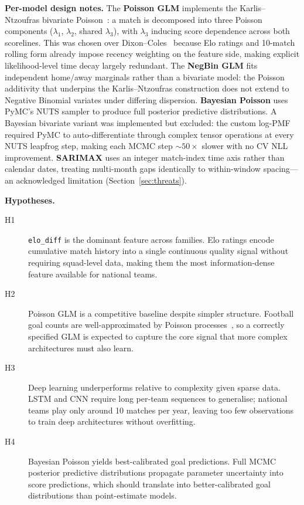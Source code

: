 \documentclass[conference]{IEEEtran}
\begin{document}
\textbf{Per-model design notes.}
The \textbf{Poisson GLM} implements the Karlis--Ntzoufras bivariate
Poisson~\cite{karlis2003analysis}: a match is decomposed into three Poisson
components ($\lambda_1$, $\lambda_2$, shared $\lambda_3$), with $\lambda_3$
inducing score dependence across both scorelines.
This was chosen over Dixon--Coles~\cite{dixon1997modelling} because Elo
ratings and 10-match rolling form already impose recency weighting on the
feature side, making explicit likelihood-level time decay largely redundant.
The \textbf{NegBin GLM} fits independent home/away marginals rather than a
bivariate model: the Poisson additivity that underpins the
Karlis--Ntzoufras construction does not extend to Negative Binomial variates
under differing dispersion.
\textbf{Bayesian Poisson} uses PyMC's NUTS sampler to produce full posterior
predictive distributions.
A Bayesian bivariate variant was implemented but excluded: the custom
log-PMF required PyMC to auto-differentiate through complex tensor
operations at every NUTS leapfrog step, making each MCMC step
${\sim}50\times$ slower with no CV NLL improvement.
\textbf{SARIMAX} uses an integer match-index time axis rather than calendar
dates, treating multi-month gaps identically to within-window spacing---an
acknowledged limitation (Section~\ref{sec:threats}).

\textbf{Hypotheses.}
\begin{description}
  \item[H1] \texttt{elo\_diff} is the dominant feature across families. Elo 
  ratings encode cumulative match history into a single continuous quality signal 
  without requiring squad-level data, making them the most information-dense 
  feature available for national teams.
  \item[H2] Poisson GLM is a competitive baseline despite simpler structure. 
  Football goal counts are well-approximated by Poisson 
  processes~\cite{maher1982modelling},
  so a correctly specified GLM is expected to capture the core signal that more
  complex architectures must also learn.
  \item[H3] Deep learning underperforms relative to complexity given sparse data. 
  LSTM and CNN require long per-team sequences to generalise; national teams play
  only around 10 matches per year, leaving too few observations to train deep
  architectures without overfitting.
  \item[H4] Bayesian Poisson yields best-calibrated goal predictions. Full 
  MCMC posterior predictive distributions propagate parameter uncertainty
  into score predictions, which should translate into better-calibrated goal 
  distributions than point-estimate models.
\end{description}
\end{document}
